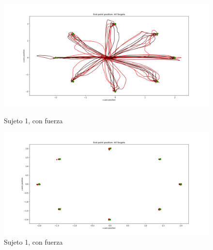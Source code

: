 \documentclass[a4paper,11pt, oneside]{book}
\begin{document}
\begin{figure}[H]
	\begin{minipage}[b]{0.5\linewidth}
		\centering
		\includegraphics[width=\linewidth]{sujeto1/force/trayectorias}
		\caption{Sujeto 1, con fuerza}
		\label{1-fase2-1}
	\end{minipage}
	\hspace{0.5cm}
	\begin{minipage}[b]{0.5\linewidth}
		\centering
		\includegraphics[width=\linewidth]{sujeto1/force/trayectorias_puntos}
		\caption{Sujeto 1, con fuerza}
		\label{1-fase2-2}
	\end{minipage}
\end{figure}
\end{document}

